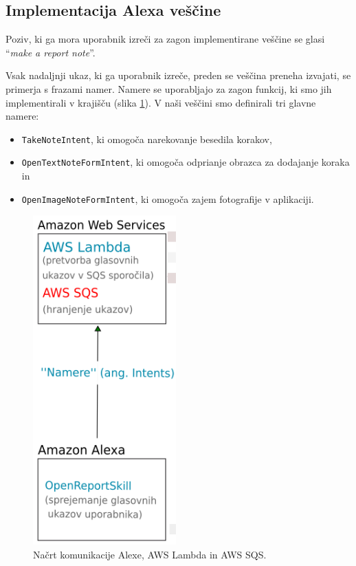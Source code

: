 \documentclass[a4paper, 12pt]{book}
\begin{document}

\subsection{Implementacija Alexa veščine}

Poziv, ki ga mora uporabnik izreči za zagon implementirane veščine se glasi \enquote{\textit{make a report note}}.

Vsak nadaljnji ukaz, ki ga uporabnik izreče, preden se veščina preneha izvajati, se primerja s frazami namer.
Namere se uporabljajo za zagon funkcij, ki smo jih implementirali v krajišču (slika \ref{plan_alexa_sqs}).
V naši veščini smo definirali tri glavne namere:

\begin{itemize}
	\item \texttt{TakeNoteIntent}, ki omogoča narekovanje besedila korakov,
	\item \texttt{OpenTextNoteFormIntent}, ki omogoča odprianje obrazca za dodajanje koraka in
	\item \texttt{OpenImageNoteFormIntent}, ki omogoča zajem fotografije v aplikaciji.
\end{itemize}

\clearpage

\begin{figure}[H]
\begin{center}
\includegraphics[width=5.5cm]{plan_alexa_sqs}
\end{center}
\caption{Načrt komunikacije Alexe, AWS Lambda in AWS SQS.}
\label{plan_alexa_sqs}
\end{figure}
\end{document}
